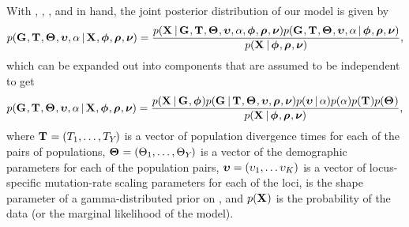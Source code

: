 \begin{linenomath}
With \alignmentVector, \hkyModelVector, \ploidyScalarVector, and
\mutationRateScalarConstantVector in hand, the joint posterior distribution
of our model is given by
\begin{equation}
    p(\geneTreeVector, \divTimeMapVector, \demographicParamVector, 
    \locusMutationRateScalarVector, \locusRateHetShapeParameter \given
    \alignmentVector, \hkyModelVector, \ploidyScalarVector,
    \mutationRateScalarConstantVector) =
    \frac{p(\alignmentVector \given \geneTreeVector, \divTimeMapVector,
        \demographicParamVector, \locusMutationRateScalarVector,
        \locusRateHetShapeParameter, \hkyModelVector, \ploidyScalarVector,
        \mutationRateScalarConstantVector)
        p(\geneTreeVector, \divTimeMapVector, \demographicParamVector,
        \locusMutationRateScalarVector, \locusRateHetShapeParameter \given
        \hkyModelVector, \ploidyScalarVector,
        \mutationRateScalarConstantVector)}{
        p(\alignmentVector \given \hkyModelVector, \ploidyScalarVector,
        \mutationRateScalarConstantVector)},
    \label{eq:fullModelCompactJoint}
\end{equation}
which can be expanded out into components that are assumed to be independent
to get
\begin{equation}
    p(\geneTreeVector, \divTimeMapVector, \demographicParamVector, 
    \locusMutationRateScalarVector, \locusRateHetShapeParameter \given
    \alignmentVector, \hkyModelVector, \ploidyScalarVector,
    \mutationRateScalarConstantVector) =
    \frac{p(\alignmentVector \given \geneTreeVector, \hkyModelVector)
        p(\geneTreeVector \given \divTimeMapVector, \demographicParamVector,
        \locusMutationRateScalarVector, \ploidyScalarVector,
        \mutationRateScalarConstantVector)
        p(\locusMutationRateScalarVector \given \locusRateHetShapeParameter)
        p(\locusRateHetShapeParameter)
        p(\divTimeMapVector)
        p(\demographicParamVector)}{
        p(\alignmentVector \given \hkyModelVector, \ploidyScalarVector,
        \mutationRateScalarConstantVector)},
    \label{eq:fullModelCompact}
\end{equation}
where
$\mathbf{T_{}} = (T_{1}, \ldots, T_{Y_{}})$
is a vector of population divergence times for each of the \npairs{} pairs of
populations,
$\mathbf{\Theta_{}} = (\Theta_{1}, \ldots,
\Theta_{Y_{}})$
is a vector of the demographic parameters for each of the \npairs{} population
pairs,
$\boldsymbol{\upsilon} = (\upsilon_{1}, \ldots
\upsilon_{K})$
is a vector of locus-specific mutation-rate scaling parameters for each of the
\nlociTotal loci,
\locusRateHetShapeParameter is the shape parameter of a gamma-distributed
prior on \locusMutationRateScalar{}, and
$p(\alignmentVector)$ is the probability of the data (or the marginal
likelihood of the model).
\end{linenomath}

